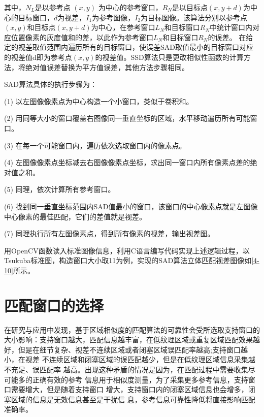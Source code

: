 其中，$N_{L}$是以参考点 $(x,y)$ 为中心的参考窗口，$R_{N}$是以目标点$(x,y+d)$为中心的目标窗口，$d$为视差，$I_{1}$为参考图像，$I_{2}$为目标图像。该算法分别以参考点$(x,y)$和目标点$(x,y+d)$为中心，在参考窗口$L_{N}$和目标窗口$R_{N}$中统计窗口内对应位置像素的灰度值和的差，以此作为参考窗口$L_{N}$和目标窗口$R_{N}$的误差。
在给定的视差取值范围内遍历所有的目标窗口，使误差SAD取值最小的目标窗口对应的视差值d即为参考点$(x,y)$的视差值。SSD算法只是更改相似性函数的计算方法，将绝对值误差替换为平方值误差，其他方法步骤相同。


SAD算法具体的执行步骤为：

(1) 以左图像像素点为中心构造一个小窗口，类似于卷积和。

(2) 用同等大小的窗口覆盖右图像同一垂直坐标的区域，水平移动遍历所有可能窗口。

(3) 在每一个可能窗口内，遍历依次选取窗口内的像素点。 

(4) 左图像像素点坐标减去右图像像素点坐标，求出同一窗口内所有像素点差的绝对值之和。

(5) 同理，依次计算所有参考窗口。

(6) 找到同一垂直坐标范围内SAD值最小的窗口，该窗口的中心像素点就是左图像中心像素的最佳匹配，它们的差值就是视差。

(7) 同理执行所有左图像素点，得到所有像素的视差，输出视差图。

用OpenCV函数读入标准图像信息，利用C语言编写代码实现上述逻辑过程，以Tsukuba标准图，构造窗口大小取11为例，实现的SAD算法立体匹配视差图像如\ref{4-10}所示。


\section{匹配窗口的选择}

在研究与应用中发现，基于区域相似度的匹配算法的可靠性会受所选取支持窗口的大小影响：支持窗口越大，匹配信息越丰富，在低纹理区域或重复区域匹配效果越好，但是在细节复杂、视差不连续区域或者闭塞区域误匹配率越高;支持窗口越小，在视差
不连续区域和闭塞区域的误匹配越少，但是在低纹理区域信息采集越不充足、误匹配率
越高。出现这种矛盾的情况是因为，在匹配过程中需要收集尽可能多的正确有效的参考
信息用于相似度测量，为了采集更多参考信息，支持窗口需要增大，但是随着支持窗口
增大，支持窗口内的闭塞区域信息也会增多，闭塞区域的信息是无效信息甚至是干扰信
息，参考信息可靠性降低将直接影响匹配准确率。

